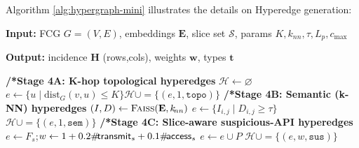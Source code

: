 \documentclass[runningheads]{llncs}
\begin{document}
Algorithm \ref{alg:hypergraph-mini} illustrates the details on Hyperedge generation:
\begin{algorithm}[h]   
\caption{Pipeline Stages Group 4}
\label{alg:hypergraph-mini}
\small          %
\textbf{Input:} FCG $G=(V,E)$, embeddings $\mathbf{E}$, slice set $\mathcal{S}$,  
                params $K,k_{\!nn},\tau,L_p,c_{\max}$ \par
\textbf{Output:} incidence $\mathbf{H}$ (rows,cols), weights $\mathbf{w}$, types $\mathbf{t}$
\begin{algorithmic}[1]
\Statex\textbf{/*Stage 4A: K-hop topological hyperedges}
\State $\mathcal{H}\gets\varnothing$
      \State $e\gets\{u\;|\;\text{dist}_G(v,u)\le K\}$\State$\mathcal{H}\cup=\{(e,1,\texttt{topo})\}$\EndIf
\EndFor
\Statex\textbf{/*Stage 4B: Semantic (k-NN) hyperedges}
\State $(I,D)\gets\textsc{Faiss}(\mathbf{E},k_{\!nn})$
      \State $e\gets\{I_{i,j}\;|\;D_{i,j}\ge\tau\}$\State$\mathcal{H}\cup=\{(e,1,\texttt{sem})\}$\EndIf
\EndFor
\Statex\textbf{/*Stage 4C: Slice-aware suspicious-API hyperedges}
      \State $e\gets F_s$;\;$w\gets1+0.2\#\!{\sf transmit}_s+0.1\#\!{\sf access}_s$
      \State$e\gets e\cup P$\EndIf\EndFor
      \State$\mathcal{H}\cup=\{(e,w,\texttt{sus})\}$\EndIf
\EndFor
\end{algorithmic}
\end{algorithm}
\end{document}
